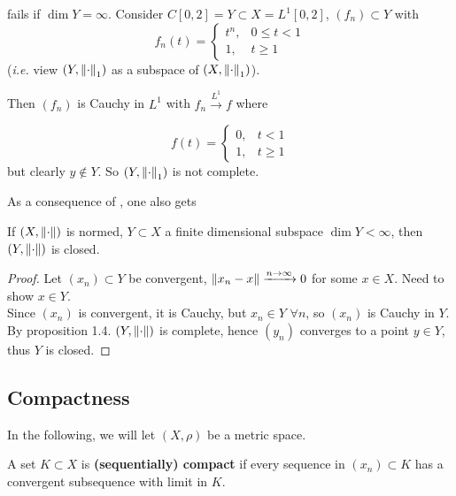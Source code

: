 \documentclass{article}
\begin{document}
\begin{example}
     fails if $\dim Y =\infty$. Consider $C[0,2]=Y \subset X = L^1[0,2]$, $(f_n) \subset Y$ with  
    $$
    f_n(t) = \begin{cases}
        t^n, & 0\leq t <1 \\
        1, & t\geq 1
    \end{cases}
    $$  
    (\textit{i.e.} view $(Y, \left\|{\cdot}\right\|_1)$ as a subspace of $(X, \left\|{\cdot}\right\|_1)$). 
    
    Then $(f_n)$ is Cauchy in $L^1$ with $f_n \overset{L^1}{\longrightarrow} f$ where  

    $$
    f(t) = \begin{cases}
        0, & t<1 \\
        1, & t \geq 1
    \end{cases}
    $$  
    but clearly $y \notin Y$. So $(Y, \left\|{\cdot}\right\|_1)$ is not complete. 
\end{example}

As a consequence of , one also gets  

\begin{corollary}
\label{finite dim is closed}
    If $(X, \left\|{\cdot}\right\|)$ is normed, $Y \subset X$ a finite dimensional subspace $\dim Y < \infty$, then $(Y, \left\|{\cdot}\right\|)$ is closed.
\end{corollary}
\begin{proof}
    Let $(x_n)\subset Y$ be convergent, $\left\|{x_n-x}\right\|\xrightarrow{n\to\infty}0$ for some $x\in X$. Need to show $x\in Y$.\\
    Since $(x_n)$ is convergent, it is Cauchy, but $x_n\in Y$ $\forall  n$, so $(x_n)$ is Cauchy in $Y$. By proposition 1.4. $(Y,\left\|{\cdot}\right\|)$ is complete, hence $(y_n)$ converges to a point $y\in Y$, thus $Y$ is closed.
\end{proof}

\subsection{Compactness}  

In the following, we will let $(X, \rho)$ be a metric 
space.  

\begin{definition}[Compact] \nextline
    A set $K \subset X$ is \textbf{(sequentially) compact} 
    if every sequence in $(x_n) \subset K$ has a convergent subsequence with limit in $K$.
\end{definition}    
\end{document}
